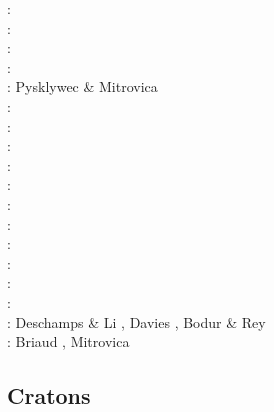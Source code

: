 \begin{scriptsize}
\nineteeneightyfive: \cite{hacr85}\\
\nineteeneightyseven: \cite{repa87}\\
\nineteenninetytwo: \cite{kiha92}\\
\nineteenninetythree: \cite{gurn93}\cite{gurn93b}\\
\nineteenninetyseven: Pysklywec \& Mitrovica \cite{pymi97}\\
\nineteenninetynine: \cite{bumo99}\\
\twothousandthree: \cite{cogu03}\\
\twothousandnine: \cite{cohu09}\\
\twothousandten: \cite{bofb10}\cite{brau10}\cite{stfh10}\cite{shml10}\\
\twothousandeleven: \cite{rapy11}\\
\twothousandtwelve: \cite{shlm12}\cite{zhzf12}\\
\twothousandthirteen: \cite{brrs13}\cite{flgm13}\\
\twothousandfifteen: \cite{aupm15}\cite{kiff15}\cite{dali15}\\
\twothousandsixteen: \cite{howa16}\cite{gvfb16}\cite{yagu16}\cite{stei16}\cite{cogb16}\\
\twothousandseventeen: \cite{yamm17}\cite{aumh17}\cite{grrb17}\\
\twothousandeighteen: \cite{osss18}\cite{vibc18}\\
\twothousandnineteen: Deschamps \& Li \cite{deli19}, Davies \etal \cite{davk19}, 
                      Bodur \& Rey \cite{bore19}\\
\twothousandtwenty: Briaud \etal \cite{braf20}, Mitrovica \etal \cite{miac20}
\end{scriptsize}


\subsection{Cratons}

